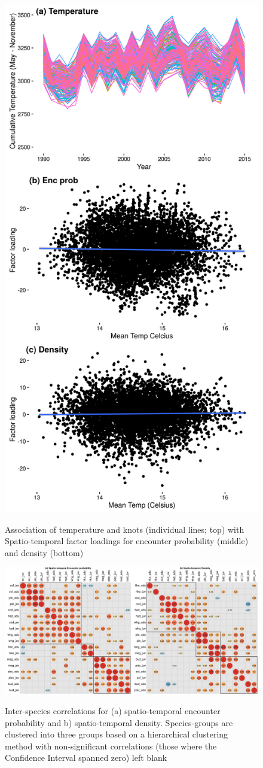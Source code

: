 \documentclass[12pt]{article}
\begin{document}
\begin{linenumbers}
\begin{figure}[!ht]
\begin{center}
	\includegraphics[width = 0.55\linewidth]{"../figures/Suppl - TempAndFactors"}
	\label{fig:S6}
	\caption{Association of temperature and knots (individual lines; top)
		with Spatio-temporal factor loadings for encounter probability
	(middle) and density (bottom)}
	\end{center}
\end{figure}



\begin{figure}[!ht]
\begin{center}
	\includegraphics[width = \linewidth]{"../figures/Suppl - Epsilon1Epsilon2_Correlations_blank"}
	\label{fig:S8}
	\caption{Inter-species correlations for (a) spatio-temporal encounter
		probability and b) spatio-temporal density.  Species-groups are
		clustered into three groups based on a hierarchical clustering
		method with non-significant correlations (those where the
		Confidence Interval spanned zero) left blank}
	\end{center}
\end{figure}


\end{linenumbers}
\end{document}
